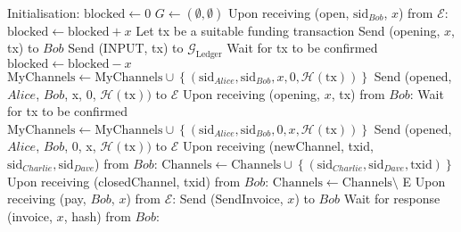 \ \\ 
  \label{alg:lightningprot}
  \begin{algorithmic}[1]
    \State Initialisation:
      \State $\mathrm{blocked} \leftarrow 0$
      \State $G \leftarrow \left(\emptyset, \emptyset\right)$
    \State
    \State Upon receiving (open, $\mathrm{sid}_{Bob}$, $x$) from $\mathcal{E}$:
        \State $\mathrm{blocked} \leftarrow \mathrm{blocked} + x$
        \State Let tx be a suitable funding transaction
        \State Send (opening, $x$, tx) to $Bob$
        \State Send (INPUT, tx) to $\mathcal{G}_{\mathrm{Ledger}}$
        \State Wait for tx to be confirmed 
        \State $\mathrm{blocked} \leftarrow \mathrm{blocked} - x$
        \State $\mathrm{MyChannels} \leftarrow \mathrm{MyChannels} \cup
        \left\{\left(\mathrm{sid}_{Alice}, \mathrm{sid}_{Bob}, x, 0,
        \mathcal{H}\left(\mathrm{tx}\right)\right)\right\}$
        \State Send (opened, $Alice$, $Bob$, x, 0, $\mathcal{H}\left(\mathrm{tx}\right))$
        to $\mathcal{E}$
      \EndIf
    \State
    \State Upon receiving (opening, $x$, tx) from $Bob$:
      \State Wait for tx to be confirmed
      \State $\mathrm{MyChannels} \leftarrow \mathrm{MyChannels} \cup
      \left\{\left(\mathrm{sid}_{Alice}, \mathrm{sid}_{Bob}, 0, x,
      \mathcal{H}\left(\mathrm{tx}\right)\right)\right\}$
      \State Send (opened, $Alice$, $Bob$, 0, x, $\mathcal{H}\left(\mathrm{tx}\right))$ to
      $\mathcal{E}$
    \State
    \State Upon receiving (newChannel, txid, $\mathrm{sid}_{Charlie},
    \mathrm{sid}_{Dave}$) from $Bob$:
        \State $\mathrm{Channels} \leftarrow \mathrm{Channels} \cup
        \left\{\left(\mathrm{sid}_{Charlie}, \mathrm{sid}_{Dave},
        \mathrm{txid}\right)\right\}$
      \EndIf
    \State
    \State Upon receiving (closedChannel, txid) from $Bob$:
        \State $\mathrm{Channels} \leftarrow \mathrm{Channels} \setminus$ E
      \EndIf
    \State
    \State Upon receiving (pay, $Bob$, $x$) from $\mathcal{E}$:
      \State Send (SendInvoice, $x$) to $Bob$
      \State Wait for response (invoice, $x$, hash) from $Bob$:

\end{algorithmic}
